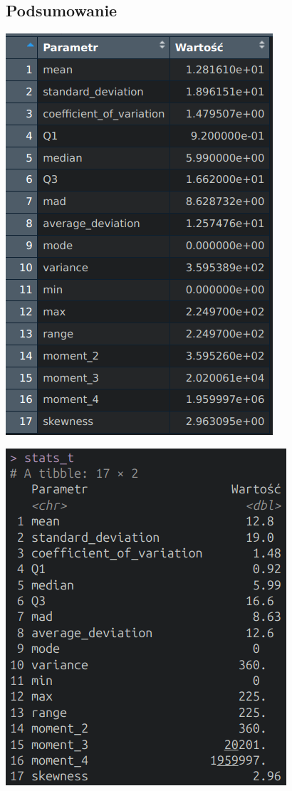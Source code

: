 \documentclass[polish]{article}
\begin{document}
    \subsection*{Podsumowanie}

    \begin{center}
      \includegraphics[scale=0.65]{img/parameters1.png}
    \end{center}

    \begin{center}
      \includegraphics[scale=0.65]{img/parameters2.png}
    \end{center}
\end{document}
